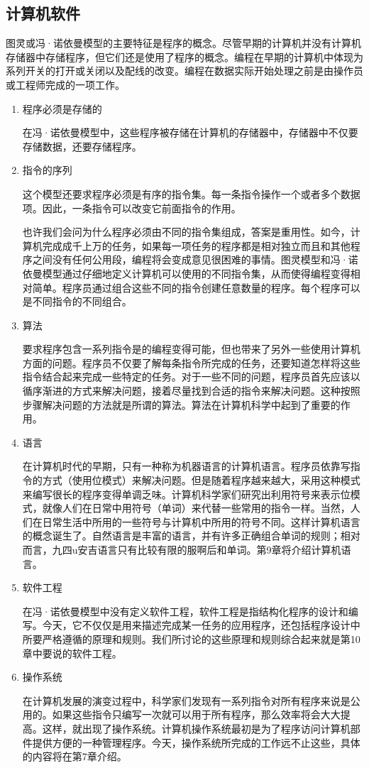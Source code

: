 \subsection{计算机软件}

图灵或冯·诺依曼模型的主要特征是程序的概念。尽管早期的计算机并没有计算机存储器中存储程序，但它们还是使用了程序的概念。编程在早期的计算机中体现为系列开关的打开或关闭以及配线的改变。编程在数据实际开始处理之前是由操作员或工程师完成的一项工作。

\begin{enumerate}
	\item 程序必须是存储的

	在冯·诺依曼模型中，这些程序被存储在计算机的存储器中，存储器中不仅要存储数据，还要存储程序。
	
	\item 指令的序列

	这个模型还要求程序必须是有序的指令集。每一条指令操作一个或者多个数据项。因此，一条指令可以改变它前面指令的作用。

	也许我们会问为什么程序必须由不同的指令集组成，答案是重用性。如今，计算机完成成千上万的任务，如果每一项任务的程序都是相对独立而且和其他程序之间没有任何公用段，编程将会变成意见很困难的事情。图灵模型和冯·诺依曼模型通过仔细地定义计算机可以使用的不同指令集，从而使得编程变得相对简单。程序员通过组合这些不同的指令创建任意数量的程序。每个程序可以是不同指令的不同组合。
	\item 算法

	要求程序包含一系列指令是的编程变得可能，但也带来了另外一些使用计算机方面的问题。程序员不仅要了解每条指令所完成的任务，还要知道怎样将这些指令结合起来完成一些特定的任务。对于一些不同的问题，程序员首先应该以循序渐进的方式来解决问题，接着尽量找到合适的指令来解决问题。这种按照步骤解决问题的方法就是所谓的算法。算法在计算机科学中起到了重要的作用。
	\item 语言

在计算机时代的早期，只有一种称为机器语言的计算机语言。程序员依靠写指令的方式（使用位模式）来解决问题。但是随着程序越来越大，采用这种模式来编写很长的程序变得单调乏味。计算机科学家们研究出利用符号来表示位模式，就像人们在日常中用符号（单词）来代替一些常用的指令一样。当然，人们在日常生活中所用的一些符号与计算机中所用的符号不同。这样计算机语言的概念诞生了。自然语言是丰富的语言，并有许多正确组合单词的规则；相对而言，九四u安吉语言只有比较有限的服啊后和单词。第9章将介绍计算机语言。
	\item 软件工程

	在冯·诺依曼模型中没有定义软件工程，软件工程是指结构化程序的设计和编写。今天，它不仅仅是用来描述完成某一任务的应用程序，还包括程序设计中所要严格遵循的原理和规则。我们所讨论的这些原理和规则综合起来就是第10章中要说的软件工程。
	\item 操作系统

	在计算机发展的演变过程中，科学家们发现有一系列指令对所有程序来说是公用的。如果这些指令只编写一次就可以用于所有程序，那么效率将会大大提高。这样，就出现了操作系统。计算机操作系统最初是为了程序访问计算机部件提供方便的一种管理程序。今天，操作系统所完成的工作远不止这些，具体的内容将在第7章介绍。
\end{enumerate}
